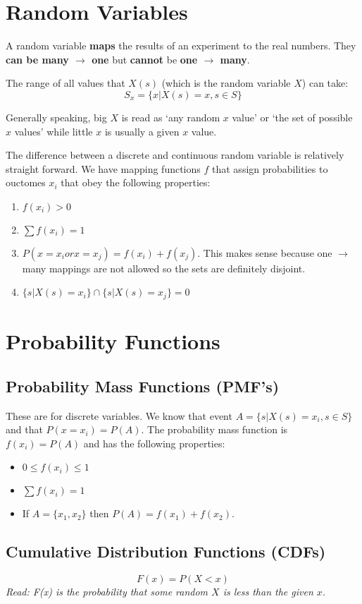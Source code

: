 \documentclass[a4paper,12pt]{report}
\begin{document}
\section{Random Variables}
A random variable \textbf{maps} the results of an experiment to the real numbers. They \textbf{can be many $\to$ one}
but \textbf{cannot}  be \textbf{one $\to$ many}. 

The range of all values that $X(s)$ (which is the random variable $X$) can take:
$$S_x = \{x | X(s) = x, s \in S\}$$

Generally speaking, big $X$ is read as `any random $x$ value' or `the set of possible $x$ values' while 
little $x$ is usually a given $x$ value.

The difference between a discrete and continuous random variable is relatively straight forward. We have 
mapping functions $f$ that assign probabilities to ouctomes $x_i$ that obey the following properties:

\begin{enumerate}
\item $f(x_i) > 0$
\item $\sum f(x_i) = 1$
\item $P(x = x_i or x = x_j) = f(x_i) + f(x_j)$. This makes sense because one $\to$ many mappings are 
not allowed so the sets are definitely disjoint.
\item $\{s|X(s) = x_i\} \cap \{s|X(s) = x_j\} = 0$
\end{enumerate}

\section{Probability Functions}
\subsection{Probability Mass Functions (PMF's)}
These are for discrete variables. We know that event $A = \{s | X(s) = x_i, s \in S\}$ and that 
$P(x = x_i) = P(A)$. The probability mass function is $f(x_i) = P(A)$ and has the following 
properties:
\begin{itemize}
\item $0 \leq f(x_i) \leq 1$
\item $\sum f(x_i) = 1$
\item If $A = \{x_1, x_2\}$ then $P(A) = f(x_1) + f(x_2)$. 
\end{itemize}

\subsection{Cumulative Distribution Functions (CDFs)}
$$F(x) = P(X < x)$$
\textit{Read: F(x) is the probability that some random $X$ is less than the given $x$.}
\end{document}
